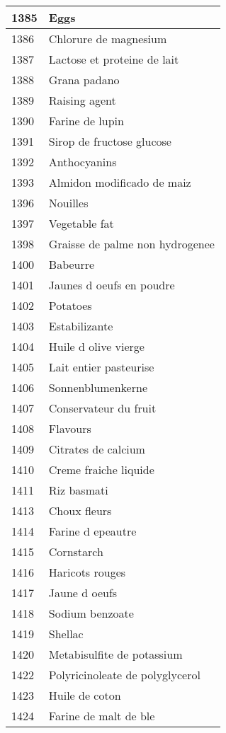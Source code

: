 \begin{longtable}{|l|l|}
1385 & Eggs \\ \hline 
1386 & Chlorure de magnesium \\ \hline 
1387 & Lactose et proteine de lait \\ \hline 
1388 & Grana padano \\ \hline 
1389 & Raising agent \\ \hline 
1390 & Farine de lupin \\ \hline 
1391 & Sirop de fructose glucose \\ \hline 
1392 & Anthocyanins \\ \hline 
1393 & Almidon modificado de maiz \\ \hline 
1396 & Nouilles \\ \hline 
1397 & Vegetable fat \\ \hline 
1398 & Graisse de palme non hydrogenee \\ \hline 
1400 & Babeurre \\ \hline 
1401 & Jaunes d oeufs en poudre \\ \hline 
1402 & Potatoes \\ \hline 
1403 & Estabilizante \\ \hline 
1404 & Huile d olive vierge \\ \hline 
1405 & Lait entier pasteurise \\ \hline 
1406 & Sonnenblumenkerne \\ \hline 
1407 & Conservateur du fruit \\ \hline 
1408 & Flavours \\ \hline 
1409 & Citrates de calcium \\ \hline 
1410 & Creme fraiche liquide \\ \hline 
1411 & Riz basmati \\ \hline 
1413 & Choux fleurs \\ \hline 
1414 & Farine d epeautre \\ \hline 
1415 & Cornstarch \\ \hline 
1416 & Haricots rouges \\ \hline 
1417 & Jaune d oeufs \\ \hline 
1418 & Sodium benzoate \\ \hline 
1419 & Shellac \\ \hline 
1420 & Metabisulfite de potassium \\ \hline 
1422 & Polyricinoleate de polyglycerol \\ \hline 
1423 & Huile de coton \\ \hline 
1424 & Farine de malt de ble \\ \hline 

\end{longtable}
